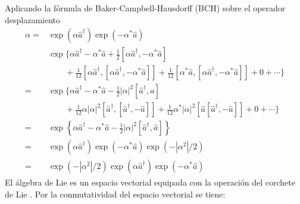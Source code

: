 \begin{enumerate}
Aplicando la fórmula de Baker-Campbell-Hausdorff (BCH) sobre el operador desplazamiento
\begin{align*}
\displaystyle{\alpha} = & \exp{(\alpha \hat{a}^{\dagger})}\exp{(-\alpha^* \hat{a})}                                                                                                         \\
& \exp \Bigg\{ \alpha \hat{a}^{\dagger} - \alpha^* \hat{a} + \frac{1}{2}[\alpha\hat{a}^{\dagger}, - \alpha^* \hat{a}]                                                             \\
& \qquad +\frac{1}{12}[\alpha\hat{a}^{\dagger},[\alpha\hat{a}^{\dagger}, - \alpha^*\hat{a}]] +\frac{1}{12}[\alpha^*\hat{a},[\alpha\hat{a}^{\dagger}, - \alpha^* \hat{a}]] + 0 + \cdots \Bigg\} \\     
=& \exp \Bigg\{ \alpha \hat{a}^{\dagger} - \alpha^* \hat{a} - \frac{1}{2}|\alpha|^2[\hat{a}^{\dagger},\hat{a}]                                                                     \\
& \qquad +\frac{1}{12}\alpha |\alpha|^2[\hat{a}^{\dagger},[\hat{a}^{\dagger},-\hat{a}]] +\frac{1}{12}\alpha^*|\alpha|^2[\hat{a}[\hat{a}^{\dagger},-\hat{a}]] + 0 + \cdots \Bigg\}\\
= & \exp \left\{ \alpha \hat{a}^{\dagger} - \alpha^{*}\hat{a} - \frac{1}{2}|\alpha|^2[\hat{a}^{\dagger},\hat{a}] \right\} \\
= & \exp(\alpha\hat{a}^{\dagger})\exp(-\alpha^{*} \hat{a})\exp(-|\alpha^2|/2) \\
= & \exp(-|\alpha^2|/2)\exp(\alpha\hat{a}^{\dagger})\exp(-\alpha^{*} \hat{a})
\end{align*}
El álgebra de Lie es un espacio vectorial equipada con la operación del corchete de Lie \cite{schwichtenberg2015physics}. Por la conmutatividad del espacio vectorial se tiene:


\end{enumerate}
